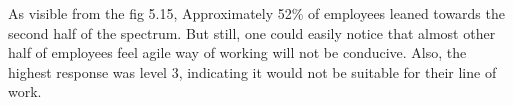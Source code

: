 \begin{enumerate}
\begin{itemize}
        As visible from the fig 5.15, Approximately 52\% of employees leaned towards the second half of the spectrum. But still, one could easily notice that almost other half of employees feel agile way of working will not be conducive. Also, the highest response was level 3, indicating it would not be suitable for their line of work.\\

    \end{itemize}

\end{enumerate}
